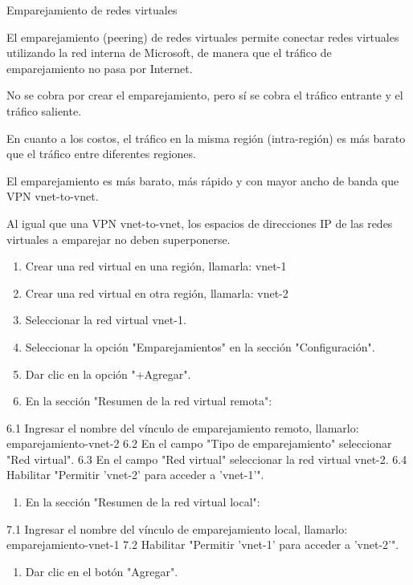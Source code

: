 Emparejamiento de redes virtuales

El emparejamiento (peering) de redes virtuales permite conectar redes virtuales utilizando la red interna de Microsoft, de manera que el tráfico de emparejamiento no pasa por Internet.

No se cobra por crear el emparejamiento, pero sí se cobra el tráfico entrante y el tráfico saliente.

En cuanto a los costos, el tráfico en la misma región (intra-región) es más barato que el tráfico entre diferentes regiones.

El emparejamiento es más barato, más rápido y con mayor ancho de banda que VPN vnet-to-vnet.

Al igual que una VPN vnet-to-vnet, los espacios de direcciones IP de las redes virtuales a emparejar no deben superponerse.

\begin{enumerate}
\item Crear una red virtual en una región, llamarla: vnet-1
\item Crear una red virtual en otra región, llamarla: vnet-2
\item Seleccionar la red virtual vnet-1.
\item Seleccionar la opción "Emparejamientos" en la sección "Configuración".
\item Dar clic en la opción "+Agregar".
\item En la sección "Resumen de la red virtual remota":
\end{enumerate}

6.1 Ingresar el nombre del vínculo de emparejamiento remoto, llamarlo: emparejamiento-vnet-2 6.2 En el campo "Tipo de emparejamiento" seleccionar "Red virtual". 6.3 En el campo "Red virtual" seleccionar la red virtual vnet-2. 6.4 Habilitar "Permitir 'vnet-2' para acceder a 'vnet-1'".

\begin{enumerate}
\item En la sección "Resumen de la red virtual local":
\end{enumerate}

7.1 Ingresar el nombre del vínculo de emparejamiento local, llamarlo: emparejamiento-vnet-1 7.2 Habilitar "Permitir 'vnet-1' para acceder a 'vnet-2'".

\begin{enumerate}
\item Dar clic en el botón "Agregar".
\end{enumerate}

